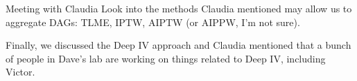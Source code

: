 \begin{Minutes}{Meeting with Claudia}
\task Look into the methods Claudia mentioned may allow us to aggregate DAGs: TLME, IPTW, AIPTW (or AIPPW, I'm not sure).

Finally, we discussed the Deep IV approach and Claudia mentioned that a bunch of people in Dave's lab are working on things related to Deep IV, including Victor.




\end{Minutes}
